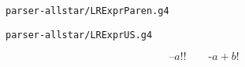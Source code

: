 \begin{frame}{}
  \begin{center}
    \texttt{parser-allstar/LRExprParen.g4}

    \vspace{0.30cm}
  \end{center}
\end{frame}

\begin{frame}{}
  \begin{center}
    \texttt{parser-allstar/LRExprUS.g4}

    \vspace{0.30cm}
  \end{center}
\end{frame}

\begin{frame}{}
  \begin{center}
  \end{center}

  \[
    \text{--}a!! \qquad \text{-}a+b!
  \]
\end{frame}
